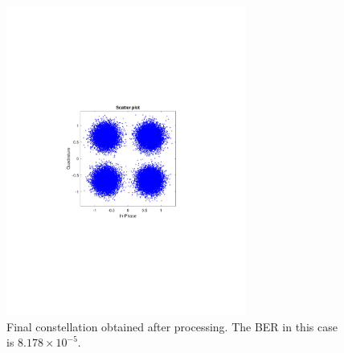 \begin{refsection}
\begin{figure}[H]
	\centering
	\includegraphics[clip, trim=4cm 8cm 4cm 8cm,
	width=0.7\textwidth]{./sdf/m_qam_system/figures/expResults/homodyne/7_4GBdInSig13dBc_const.pdf}
	\caption{Final constellation obtained after processing. The BER in this case is $8.178 \times 10^{-5}$.}
	\label{fig:4GBdFinalHm}
\end{figure}


\end{refsection}
